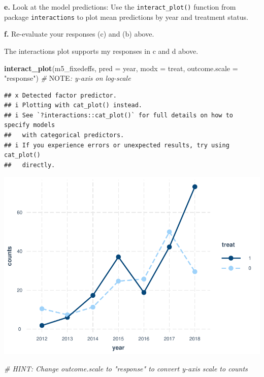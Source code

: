 \documentclass[
]{article}
\newenvironment{Shaded}{\begin{snugshade}}{\end{snugshade}}
\newcommand{\AlertTok}[1]{\textcolor[rgb]{0.94,0.16,0.16}{#1}}
\newcommand{\AttributeTok}[1]{\textcolor[rgb]{0.13,0.29,0.53}{#1}}
\newcommand{\CommentTok}[1]{\textcolor[rgb]{0.56,0.35,0.01}{\textit{#1}}}
\newcommand{\FunctionTok}[1]{\textcolor[rgb]{0.13,0.29,0.53}{\textbf{#1}}}
\newcommand{\NormalTok}[1]{#1}
\newcommand{\StringTok}[1]{\textcolor[rgb]{0.31,0.60,0.02}{#1}}
\begin{document}
\textbf{e.} Look at the model predictions: Use the
\texttt{interact\_plot()} function from package \texttt{interactions} to
plot mean predictions by year and treatment status.

\textbf{f.} Re-evaluate your responses (c) and (b) above.

The interactions plot supports my responses in c and d above.

\begin{Shaded}
\begin{Highlighting}[]
\FunctionTok{interact\_plot}\NormalTok{(m5\_fixedeffs, }\AttributeTok{pred =}\NormalTok{ year, }\AttributeTok{modx =}\NormalTok{ treat,}
              \AttributeTok{outcome.scale =} \StringTok{"response"}\NormalTok{) }\CommentTok{\# }\AlertTok{NOTE}\CommentTok{: y{-}axis on log{-}scale}
\end{Highlighting}
\end{Shaded}

\begin{verbatim}
## x Detected factor predictor.
## i Plotting with cat_plot() instead.
## i See `?interactions::cat_plot()` for full details on how to specify models
##   with categorical predictors.
## i If you experience errors or unexpected results, try using cat_plot()
##   directly.
\end{verbatim}

\includegraphics{hw1-lobstrs-eds241_files/figure-latex/unnamed-chunk-31-1.pdf}

\begin{Shaded}
\begin{Highlighting}[]
\CommentTok{\# HINT: Change \textasciigrave{}outcome.scale\textasciigrave{} to "response" to convert y{-}axis scale to counts}
\end{Highlighting}
\end{Shaded}
\end{document}
